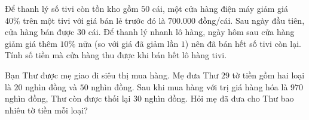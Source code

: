 \begin{ex}%
	Để thanh lý số tivi còn tồn kho gồm $50$ cái, một cửa hàng điện máy giảm giá $40\%$ trên một tivi với giá bán lẻ trước đó là $700.000$ đồng/cái. Sau ngày đầu tiên, cửa hàng bán được $30$ cái. Để thanh lý nhanh lô hàng, ngày hôm sau cửa hàng giảm giá thêm $10\%$ nữa (so với giá đã giảm lần $1$) nên đã bán hết số tivi còn lại. Tính số tiền mà cửa hàng thu được khi bán hết lô hàng tivi.
\end{ex}

\begin{ex}%
	Bạn Thư được mẹ giao đi siêu thị mua hàng. Mẹ đưa Thư $29$ tờ tiền gồm hai loại là $20$ nghìn đồng và $50$ nghìn đồng. Sau khi mua hàng với trị giá hàng hóa là $970$ nghìn đồng, Thư còn được thối lại $30$ nghìn đồng. Hỏi mẹ đã đưa cho Thư bao nhiêu tờ tiền mỗi loại?
\end{ex}

